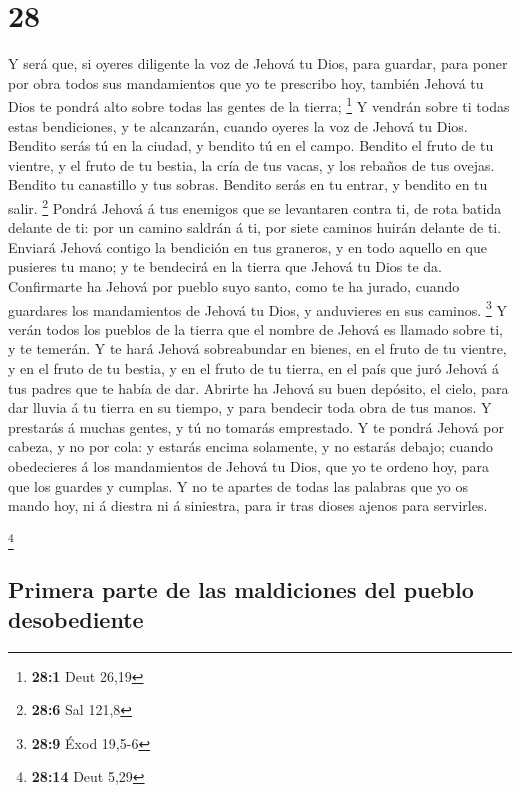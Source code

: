 \hypertarget{section-27}{%
\section{28}\label{section-27}}

 Y será que, si oyeres diligente la voz de Jehová tu Dios,
para guardar, para poner por obra todos sus mandamientos que yo te
prescribo hoy, también Jehová tu Dios te pondrá alto sobre todas las
gentes de la tierra; \footnote{\textbf{28:1} Deut 26,19}  Y
vendrán sobre ti todas estas bendiciones, y te alcanzarán, cuando oyeres
la voz de Jehová tu Dios.  Bendito serás tú en la ciudad, y
bendito tú en el campo.  Bendito el fruto de tu vientre, y
el fruto de tu bestia, la cría de tus vacas, y los rebaños de tus
ovejas.  Bendito tu canastillo y tus sobras. 
Bendito serás en tu entrar, y bendito en tu salir. \footnote{\textbf{28:6}
  Sal 121,8}  Pondrá Jehová á tus enemigos que se levantaren
contra ti, de rota batida delante de ti: por un camino saldrán á ti, por
siete caminos huirán delante de ti.  Enviará Jehová contigo
la bendición en tus graneros, y en todo aquello en que pusieres tu mano;
y te bendecirá en la tierra que Jehová tu Dios te da. 
Confirmarte ha Jehová por pueblo suyo santo, como te ha jurado, cuando
guardares los mandamientos de Jehová tu Dios, y anduvieres en sus
caminos. \footnote{\textbf{28:9} Éxod 19,5-6}  Y verán
todos los pueblos de la tierra que el nombre de Jehová es llamado sobre
ti, y te temerán.  Y te hará Jehová sobreabundar en bienes,
en el fruto de tu vientre, y en el fruto de tu bestia, y en el fruto de
tu tierra, en el país que juró Jehová á tus padres que te había de dar.
 Abrirte ha Jehová su buen depósito, el cielo, para dar
lluvia á tu tierra en su tiempo, y para bendecir toda obra de tus manos.
Y prestarás á muchas gentes, y tú no tomarás emprestado.  Y
te pondrá Jehová por cabeza, y no por cola: y estarás encima solamente,
y no estarás debajo; cuando obedecieres á los mandamientos de Jehová tu
Dios, que yo te ordeno hoy, para que los guardes y cumplas.
 Y no te apartes de todas las palabras que yo os mando hoy,
ni á diestra ni á siniestra, para ir tras dioses ajenos para servirles.

\footnote{\textbf{28:14} Deut 5,29}

\hypertarget{primera-parte-de-las-maldiciones-del-pueblo-desobediente}{%
\subsection{Primera parte de las maldiciones del pueblo
desobediente}\label{primera-parte-de-las-maldiciones-del-pueblo-desobediente}}

